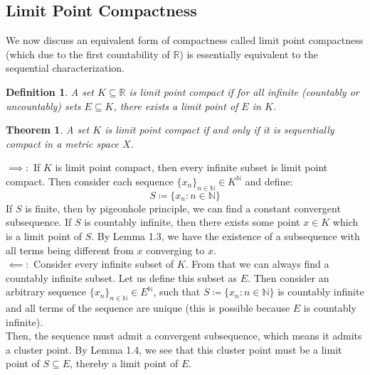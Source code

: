 \documentclass[10pt,letterpaper]{article} %
\newtheorem{thm}{Theorem}[section]
\newtheorem{defn}{Definition}[section]
\begin{document}
\subsection{Limit Point Compactness}
We now discuss an equivalent form of compactness called limit point compactness (which due to the first countability of $\mathbb{R}$) is essentially equivalent to the sequential characterization.

\begin{defn}
A set $K \subseteq \mathbb{R}$ is limit point compact if for all infinite (countably or uncountably) sets $E \subseteq K$, there exists a limit point of $E$ in $K$.
\end{defn}

\begin{thm}
A set $K$ is limit point compact if and only if it is sequentially compact in a metric space $X$.
\end{thm}
$\implies:$ If $K$ is limit point compact, then every infinite subset is limit point compact. Then consider each sequence $\{x_n\}_{n \in \mathbb{N}} \in K^\mathbb{N}$ and define:
\begin{equation*}
S \coloneq \{x_n : n \in \mathbb{N}\}
\end{equation*}
If $S$ is finite, then by pigeonhole principle, we can find a constant convergent subsequence. If $S$ is countably infinite, then there exists some point $x \in K$ which is a limit point of $S$. By Lemma 1.3, we have the existence of a subsequence with all terms being different from $x$ converging to $x$.\\

$\impliedby:$ Consider every infinite subset of $K$. From that we can always find a countably infinite subset. Let us define this subset as $E$. Then consider an arbitrary sequence $\{x_n\}_{n \in \mathbb{N}} \in E^\mathbb{N}$, such that $S \coloneq \{x_n : n \in \mathbb{N}\}$ is countably infinite and all terms of the sequence are unique (this is possible because $E$ is countably infinite).\\

Then, the sequence must admit a convergent subsequence, which means it admits a cluster point. By Lemma 1.4, we see that this cluster point must be a limit point of $S \subseteq E$, thereby a limit point of $E$.
\end{document}
